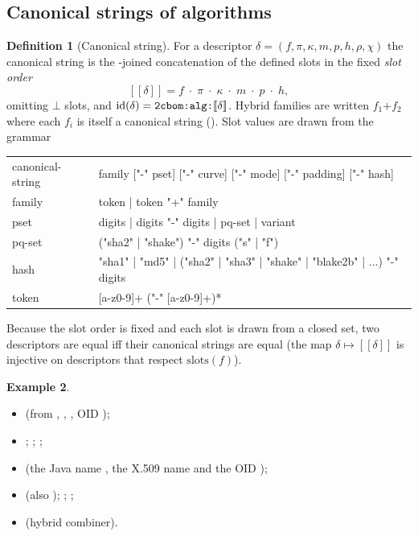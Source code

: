 \documentclass[11pt,a4paper]{article}
\newcommand{\codem}[1]{\texttt{\detokenize{#1}}}
\newcommand{\sem}[1]{\llbracket #1 \rrbracket}
\newcommand{\llbracket}{[\![}
\newcommand{\rrbracket}{]\!]}
\newcommand{\id}{\operatorname{id}}
\theoremstyle{definition}
\newtheorem{definition}{Definition}[section]
\newtheorem{example}[definition]{Example}
\theoremstyle{plain}
\begin{document}
\subsection{Canonical strings of algorithms}
\begin{definition}[Canonical string]\label{def:canonstring}
For a descriptor $\delta=(f,\pi,\kappa,m,p,h,\rho,\chi)$ the canonical string is the
\code{-}-joined concatenation of the defined slots in the fixed \emph{slot order}
$$\sem{\delta} = f \;\cdot\; \pi \;\cdot\; \kappa \;\cdot\; m \;\cdot\; p \;\cdot\; h,$$
omitting $\bot$ slots, and $\id(\delta) = \codem{2cbom:alg:}\sem{\delta}$. Hybrid families are
written $f_1\text{+}f_2$ where each $f_i$ is itself a canonical string
(). Slot values are drawn from the grammar
\begin{center}\ttfamily\small
\begin{tabular}{l@{\ ::=\ }p{11.2cm}}
canonical-string & family ["-" pset] ["-" curve] ["-" mode] ["-" padding] ["-" hash] \\
family           & token | token "+" family \\
pset             & digits | digits "-" digits | pq-set | variant \\
pq-set           & ("sha2" | "shake") "-" digits ("s" | "f") \\
hash             & "sha1" | "md5" | ("sha2" | "sha3" | "shake" | "blake2b" | ...) "-" digits \\
token            & [a-z0-9]+ ("-" [a-z0-9]+)*
\end{tabular}
\end{center}
\end{definition}
Because the slot order is fixed and each slot is drawn from a closed set, two descriptors are
equal iff their canonical strings are equal (the map $\delta \mapsto \sem{\delta}$ is injective on
descriptors that respect $\mathrm{slots}(f)$).

\begin{example}
\begin{itemize}[nosep]
\item {} (from , , , OID );
\item {}; ; ;
\item {} (the Java name , the X.509 name
       and the OID );
\item {} (also ); ; ;
\item {} (hybrid combiner).
\end{itemize}
\end{example}
\end{document}
